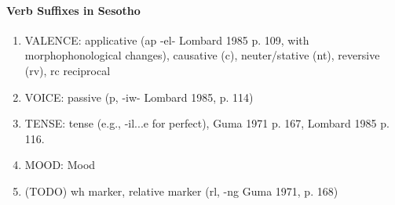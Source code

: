 \paragraph{Verb Suffixes in Sesotho}


\begin{enumerate}
    \item VALENCE: applicative (ap -el- Lombard 1985 p. 109, with morphophonological changes), causative (c), neuter/stative (nt), reversive (rv), rc reciprocal
    \item VOICE: passive (p, -iw- Lombard 1985, p. 114)
    \item TENSE: tense (e.g., -il...e for perfect), Guma 1971 p. 167, Lombard 1985 p. 116.
    \item MOOD: Mood
    \item (TODO) wh marker, relative marker (rl, -ng Guma 1971, p. 168)
\end{enumerate}








